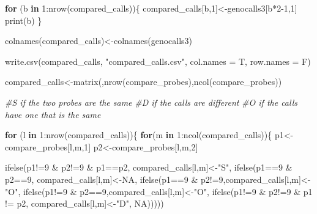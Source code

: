 \documentclass[
]{article}
\newenvironment{Shaded}{\begin{snugshade}}{\end{snugshade}}
\newcommand{\AttributeTok}[1]{\textcolor[rgb]{0.77,0.63,0.00}{#1}}
\newcommand{\CommentTok}[1]{\textcolor[rgb]{0.56,0.35,0.01}{\textit{#1}}}
\newcommand{\ConstantTok}[1]{\textcolor[rgb]{0.00,0.00,0.00}{#1}}
\newcommand{\ControlFlowTok}[1]{\textcolor[rgb]{0.13,0.29,0.53}{\textbf{#1}}}
\newcommand{\DecValTok}[1]{\textcolor[rgb]{0.00,0.00,0.81}{#1}}
\newcommand{\FunctionTok}[1]{\textcolor[rgb]{0.00,0.00,0.00}{#1}}
\newcommand{\NormalTok}[1]{#1}
\newcommand{\OtherTok}[1]{\textcolor[rgb]{0.56,0.35,0.01}{#1}}
\newcommand{\SpecialCharTok}[1]{\textcolor[rgb]{0.00,0.00,0.00}{#1}}
\newcommand{\StringTok}[1]{\textcolor[rgb]{0.31,0.60,0.02}{#1}}
\begin{document}
\begin{Shaded}
\begin{Highlighting}[]
\ControlFlowTok{for}\NormalTok{ (b }\ControlFlowTok{in} \DecValTok{1}\SpecialCharTok{:}\FunctionTok{nrow}\NormalTok{(compared\_calls))\{}
\NormalTok{    compared\_calls[b,}\DecValTok{1}\NormalTok{]}\OtherTok{\textless{}{-}}\NormalTok{genocalls3[b}\SpecialCharTok{*}\DecValTok{2{-}1}\NormalTok{,}\DecValTok{1}\NormalTok{]}
  \FunctionTok{print}\NormalTok{(b)}
\NormalTok{\}}

\FunctionTok{colnames}\NormalTok{(compared\_calls)}\OtherTok{\textless{}{-}}\FunctionTok{colnames}\NormalTok{(genocalls3)}

\FunctionTok{write.csv}\NormalTok{(compared\_calls, }\StringTok{"compared\_calls.csv"}\NormalTok{, }\AttributeTok{col.names =}\NormalTok{ T, }\AttributeTok{row.names =}\NormalTok{ F)}



\NormalTok{compared\_calls}\OtherTok{\textless{}{-}}\FunctionTok{matrix}\NormalTok{(,}\FunctionTok{nrow}\NormalTok{(compare\_probes),}\FunctionTok{ncol}\NormalTok{(compare\_probes))}

\CommentTok{\#S if the two probes are the same}
\CommentTok{\#D if the calls are different}
\CommentTok{\#O if the calls have one that is the same}




\ControlFlowTok{for}\NormalTok{ (l }\ControlFlowTok{in} \DecValTok{1}\SpecialCharTok{:}\FunctionTok{nrow}\NormalTok{(compared\_calls))\{}
  \ControlFlowTok{for}\NormalTok{(m }\ControlFlowTok{in} \DecValTok{1}\SpecialCharTok{:}\FunctionTok{ncol}\NormalTok{(compared\_calls))\{}
\NormalTok{    p1}\OtherTok{\textless{}{-}}\NormalTok{compare\_probes[l,m,}\DecValTok{1}\NormalTok{]}
\NormalTok{    p2}\OtherTok{\textless{}{-}}\NormalTok{compare\_probes[l,m,}\DecValTok{2}\NormalTok{]}
    
    \FunctionTok{ifelse}\NormalTok{(p1}\SpecialCharTok{!=}\DecValTok{9} \SpecialCharTok{\&}\NormalTok{ p2}\SpecialCharTok{!=}\DecValTok{9} \SpecialCharTok{\&}\NormalTok{ p1}\SpecialCharTok{==}\NormalTok{p2, compared\_calls[l,m]}\OtherTok{\textless{}{-}}\StringTok{"S"}\NormalTok{,}
           \FunctionTok{ifelse}\NormalTok{(p1}\SpecialCharTok{==}\DecValTok{9} \SpecialCharTok{\&}\NormalTok{ p2}\SpecialCharTok{==}\DecValTok{9}\NormalTok{, compared\_calls[l,m]}\OtherTok{\textless{}{-}}\ConstantTok{NA}\NormalTok{,       }
                  \FunctionTok{ifelse}\NormalTok{(p1}\SpecialCharTok{==}\DecValTok{9} \SpecialCharTok{\&}\NormalTok{ p2}\SpecialCharTok{!=}\DecValTok{9}\NormalTok{,compared\_calls[l,m]}\OtherTok{\textless{}{-}}\StringTok{"O"}\NormalTok{,       }
                         \FunctionTok{ifelse}\NormalTok{(p1}\SpecialCharTok{!=}\DecValTok{9} \SpecialCharTok{\&}\NormalTok{ p2}\SpecialCharTok{==}\DecValTok{9}\NormalTok{,compared\_calls[l,m]}\OtherTok{\textless{}{-}}\StringTok{"O"}\NormalTok{,              }
                                \FunctionTok{ifelse}\NormalTok{(p1}\SpecialCharTok{!=}\DecValTok{9} \SpecialCharTok{\&}\NormalTok{ p2}\SpecialCharTok{!=}\DecValTok{9} \SpecialCharTok{\&}\NormalTok{ p1 }\SpecialCharTok{!=}\NormalTok{ p2, compared\_calls[l,m]}\OtherTok{\textless{}{-}}\StringTok{"D"}\NormalTok{,                       }
                                       \ConstantTok{NA}\NormalTok{)))))            }
    

\end{Highlighting}
\end{Shaded}
\end{document}
